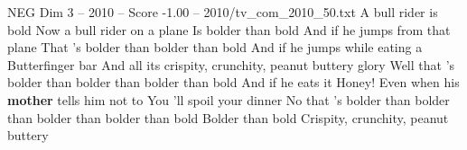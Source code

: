\begin{textsample}{NEG Dim 3 – 2010 – Score -1.00 – 2010/tv\_com\_2010\_50.txt}  \label{ex:f3_neg_053}
A bull rider is bold Now a bull rider on a plane Is bolder than bold And if he jumps from that plane That 's bolder than bolder than bold And if he jumps while eating a Butterfinger bar And all its crispity, crunchity, peanut buttery glory Well that 's bolder than bolder than bolder than bold And if he eats it Honey!
Even when his \textbf{mother} tells him not to You 'll spoil your dinner No that 's bolder than bolder than bolder than bolder than bold Bolder than bold Crispity, crunchity, peanut buttery

\end{textsample}
